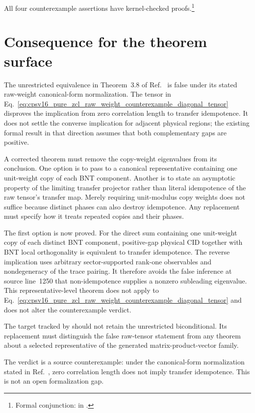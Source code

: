 \documentclass{article}
\begin{document}
All four counterexample assertions have kernel-checked proofs.\footnote{Formal
conjunction:
in .}

\section{Consequence for the theorem surface}

The unrestricted equivalence in Theorem~3.8 of
Ref.~\cite{Cirac2016MPDO_arXiv} is false under its stated raw-weight
canonical-form normalization. The tensor in
Eq.~\ref{eq:cpsv16_pure_zcl_raw_weight_counterexample_diagonal_tensor}
disproves the implication from zero correlation length to transfer
idempotence. It does not settle the converse implication for adjacent physical
regions; the existing formal result in that direction assumes that both
complementary gaps are positive.

A corrected theorem must remove the copy-weight eigenvalues from its
conclusion. One option is to pass to a canonical representative containing one
unit-weight copy of each BNT component. Another is to state an asymptotic
property of the limiting transfer projector rather than literal idempotence of
the raw tensor's transfer map. Merely requiring unit-modulus copy weights does
not suffice because distinct phases can also destroy idempotence. Any
replacement must specify how it treats repeated copies and their phases.

The first option is now proved. For the direct sum containing one unit-weight
copy of each distinct BNT component, positive-gap physical CID together with
BNT local orthogonality is equivalent to transfer idempotence. The reverse
implication uses arbitrary sector-supported rank-one observables and
nondegeneracy of the trace pairing. It therefore avoids the false inference at
source line~1250 that non-idempotence supplies a nonzero subleading eigenvalue.
This representative-level theorem does not apply to
Eq.~\ref{eq:cpsv16_pure_zcl_raw_weight_counterexample_diagonal_tensor} and
does not alter the counterexample verdict.

The target tracked by  should not retain the unrestricted
biconditional. Its replacement must distinguish the false raw-tensor statement
from any theorem about a selected representative of the generated
matrix-product-vector family.

The verdict is a source counterexample: under the canonical-form normalization
stated in Ref.~\cite{Cirac2016MPDO_arXiv}, zero correlation length does not
imply transfer idempotence. This is not an open formalization gap.



\end{document}
